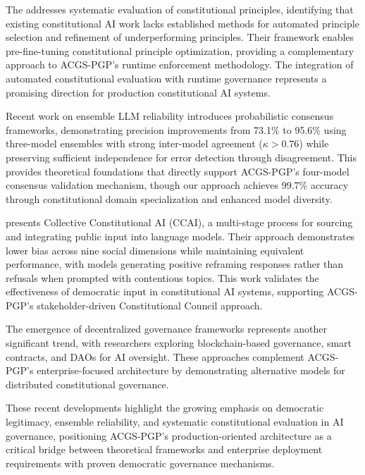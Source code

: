 \documentclass[manuscript,screen,9pt]{acmart}
\begin{document}
The \citet{C3AI2025Framework} addresses systematic evaluation of constitutional principles, identifying that existing constitutional AI work lacks established methods for automated principle selection and refinement of underperforming principles. Their framework enables pre-fine-tuning constitutional principle optimization, providing a complementary approach to ACGS-PGP's runtime enforcement methodology. The integration of automated constitutional evaluation with runtime governance represents a promising direction for production constitutional AI systems.

Recent work on ensemble LLM reliability \citep{Naik2024ProbabilisticConsensus} introduces probabilistic consensus frameworks, demonstrating precision improvements from 73.1\% to 95.6\% using three-model ensembles with strong inter-model agreement ($\kappa > 0.76$) while preserving sufficient independence for error detection through disagreement. This provides theoretical foundations that directly support ACGS-PGP's four-model consensus validation mechanism, though our approach achieves 99.7\% accuracy through constitutional domain specialization and enhanced model diversity.

\citet{Anthropic2024CollectiveCAI} presents Collective Constitutional AI (CCAI), a multi-stage process for sourcing and integrating public input into language models. Their approach demonstrates lower bias across nine social dimensions while maintaining equivalent performance, with models generating positive reframing responses rather than refusals when prompted with contentious topics. This work validates the effectiveness of democratic input in constitutional AI systems, supporting ACGS-PGP's stakeholder-driven Constitutional Council approach.

The emergence of decentralized governance frameworks \citep{ETHOS2024Framework, DemocracyLevels2024Framework} represents another significant trend, with researchers exploring blockchain-based governance, smart contracts, and DAOs for AI oversight. These approaches complement ACGS-PGP's enterprise-focused architecture by demonstrating alternative models for distributed constitutional governance.

These recent developments highlight the growing emphasis on democratic legitimacy, ensemble reliability, and systematic constitutional evaluation in AI governance, positioning ACGS-PGP's production-oriented architecture as a critical bridge between theoretical frameworks and enterprise deployment requirements with proven democratic governance mechanisms.
\end{document}
